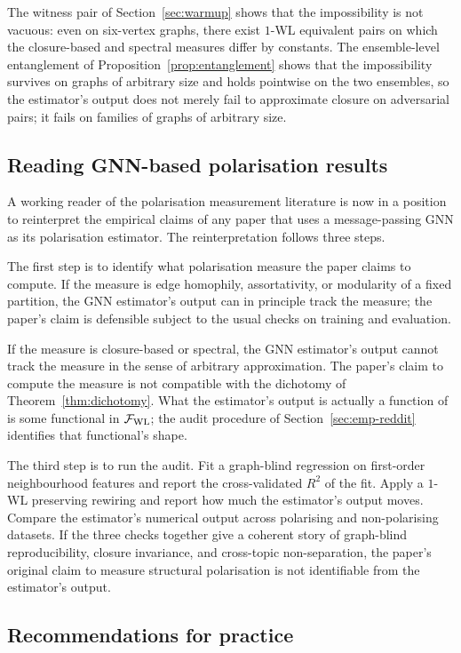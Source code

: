 The witness pair of Section~\ref{sec:warmup} shows that the impossibility is
not vacuous: even on six-vertex graphs, there exist $1$-WL equivalent
pairs on which the closure-based and spectral measures differ by
constants. The ensemble-level entanglement of
Proposition~\ref{prop:entanglement} shows that the impossibility survives on
graphs of arbitrary size and holds pointwise on the two ensembles,
so the estimator's output does not merely fail to approximate
closure on adversarial pairs; it fails on families of graphs of
arbitrary size.

\subsection{Reading GNN-based polarisation results}

A working reader of the polarisation measurement literature is now
in a position to reinterpret the empirical claims of any paper that
uses a message-passing GNN as its polarisation estimator. The
reinterpretation follows three steps.

The first step is to identify what polarisation measure the paper
claims to compute. If the measure is edge homophily, assortativity,
or modularity of a fixed partition, the GNN estimator's output can
in principle track the measure; the paper's claim is defensible
subject to the usual checks on training and evaluation.

If the measure is closure-based or spectral, the GNN estimator's
output cannot track the measure in the sense of arbitrary
approximation. The paper's claim to compute the measure is not
compatible with the dichotomy of Theorem~\ref{thm:dichotomy}. What the
estimator's output is actually a function of is some functional in
$\mathcal{F}_{\mathrm{WL}}$; the audit procedure of Section~\ref{sec:emp-reddit}
identifies that functional's shape.

The third step is to run the audit. Fit a graph-blind regression on
first-order neighbourhood features and report the cross-validated
$R^2$ of the fit. Apply a $1$-WL preserving rewiring and report
how much the estimator's output moves. Compare the estimator's
numerical output across polarising and non-polarising datasets. If
the three checks together give a coherent story of graph-blind
reproducibility, closure invariance, and cross-topic
non-separation, the paper's original claim to measure structural
polarisation is not identifiable from the estimator's output.

\subsection{Recommendations for practice}

